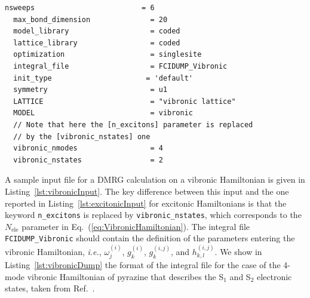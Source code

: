 \documentclass[bibliography=totoc,12pt,a4paper]{scrartcl}
\begin{document}
\begin{lstlisting}[language=qcmaquis,
				   caption={Input example for a vibronic DMRG calculation},
				   label=lst:vibronicInput]
  nsweeps                         = 6
  max_bond_dimension              = 20
  model_library                   = coded
  lattice_library                 = coded
  optimization                    = singlesite
  integral_file                   = FCIDUMP_Vibronic
  init_type                      = 'default'
  symmetry                        = u1
  LATTICE                         = "vibronic lattice"
  MODEL                           = vibronic
  // Note that here the [n_excitons] parameter is replaced 
  // by the [vibronic_nstates] one
  vibronic_nmodes                 = 4
  vibronic_nstates                = 2
\end{lstlisting}

A sample input file for a DMRG calculation on a vibronic Hamiltonian is given in Listing~\ref{lst:vibronicInput}.
The key difference between this input and the one reported in Listing~\ref{lst:excitonicInput} for excitonic Hamiltonians is that the keyword \texttt{n\_excitons} is replaced by \texttt{vibronic\_nstates}, which corresponds to the $N_\text{ele}$ parameter in Eq.~(\ref{eq:VibronicHamiltonian}).
The integral file \texttt{FCIDUMP\_Vibronic} should contain the definition of the parameters entering the vibronic Hamiltonian, \textit{i.e.}, $\omega_j^{(i)}$, $g_k^{(i)}$, $g_k^{(i,j)}$, and $h_{k,l}^{(i,j)}$.
We show in Listing~\ref{lst:vibronicDump} the format of the integral file for the case of the 4-mode vibronic Hamiltonian of pyrazine that describes the S$_1$ and S$_2$ electronic states, taken from Ref.~.
\end{document}
